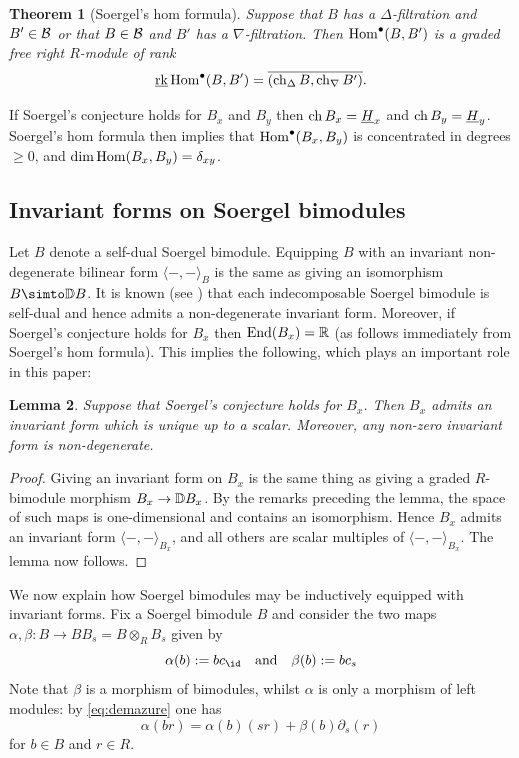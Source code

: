 \documentclass[11pt]{amsart}
\numberwithin{equation}{section}
\def\BS{{\EuScript B}}
\def\a{\alpha}
\def\b{\beta}
\def\ov{\overline}
\def\un{\underline}
\def\to{\rightarrow}
\DeclareMathOperator{\End}{End} %
\newtheorem{thm}{Theorem}[section]
\newtheorem{lem}[thm]{Lemma}
\theoremstyle{definition}
\theoremstyle{remark}
\DeclareMathOperator{\rk}{rk}
\DeclareMathOperator{\grk}{\un{\rk}}
\begin{document}
\begin{thm}[Soergel's hom formula] \label{thm:hom} Suppose that $B$
  has a $\Delta$-filtration and $B' \in {\mathcal{B}}$ or that $B \in {\mathcal{B}}$ and
  $B'$ has a $\nabla$-filtration. Then $\operatorname{Hom}^\bullet(B, B')$ is a graded free
  right $R$-module of rank 
\[
\grk \Hom^\bullet(B, B') = \ov{(\ch_\Delta B,\ch_\nabla B')}.
\]
\end{thm}

If Soergel's conjecture holds for $B_x$ and $B_y$ then 
$\ch B_x = \un{H}_x$ and $\ch B_y = \un{H}_y$. Soergel's hom formula
then implies that $\operatorname{Hom}^\bullet(B_x,
B_y)$ is concentrated in degrees $\ge 0$, and $\dim \operatorname{Hom}(B_x,B_y) = \delta_{xy}$.

\subsection{Invariant forms on Soergel bimodules} \label{sec:invariant
  forms} Let $B$ denote a self-dual Soergel bimodule. Equipping $B$ with an invariant non-degenerate bilinear form $\langle -, - \rangle_B$ is the same as
giving an isomorphism $B \simto \DM B$. It is known (see \cite[Satz
6.14]{S3}) that each indecomposable Soergel bimodule is 
self-dual and hence admits a non-degenerate invariant form. Moreover, if Soergel's conjecture holds for $B_x$ then $\End(B_x) = \RM$ (as follows immediately from Soergel's hom formula).
This implies the following, which plays an important role in this paper:

\begin{lem} \label{lem:unique form} Suppose that Soergel's conjecture
  holds for $B_x$. Then $B_x$ admits an invariant form which is unique
  up to a scalar. Moreover, any non-zero
invariant form is non-degenerate. \end{lem}

\begin{proof} Giving an invariant form on $B_x$ is the same thing as
  giving a graded $R$-bimodule morphism $B_x \to \DM B_x$. By the remarks
  preceding the lemma, the space of such maps is one-dimensional and
  contains an isomorphism. Hence $B_x$ admits an invariant form
  $\langle - , - \rangle_{B_x}$, and all others are scalar multiples
  of $\langle -, - \rangle_{B_x}$. The lemma now follows.
\end{proof}

We now explain how Soergel bimodules may be inductively equipped with
invariant forms. Fix a Soergel bimodule $B$ and consider the two maps
$\a, \b : B \to BB_s = B \otimes_R B_s$ given by
\[
\a(b) := bc_{\id} \quad \text{and} \quad \b(b) := bc_s
\]
Note that $\b$ is a morphism of bimodules, whilst $\a$ is only a
morphism of left modules: by \eqref{eq:demazure} one has
\begin{equation} \label{eq:alphar}
\a(br) = \a(b)(sr) + \b(b) \partial_s(r)
\end{equation}
for $b \in B$ and $r \in R$.
\end{document}
